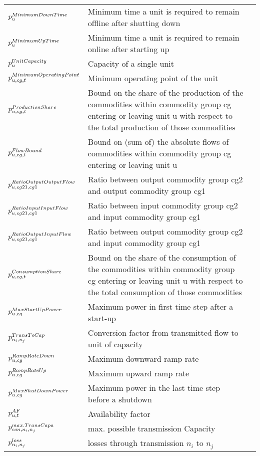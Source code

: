 \begin{longtable}{p{\cola} p{\colc} >{\small\raggedleft\arraybackslash\itshape}p{\colb}}
		$p^{MinimumDownTime}_{u}$	& Minimum time a unit is required to remain offline after shutting down	&                \\
		$p^{MinimumUpTime}_{u}$	& Minimum time a unit is required to remain online after starting up	&                \\
		$p^{UnitCapacity}_{u} $	& Capacity of a single unit                                   	&                \\
		$p^{MinimumOperatingPoint}_{u,cg,t}$	& Minimum operating point of the unit                         	&                \\
		$p^{ProductionShare}_{u,cg,t}$	& Bound on the share of the production of the commodities within commodity group cg entering or leaving unit u with respect to the total production of those commodities	&                \\
		$p^{FlowBound}_{u,cg,t}    $	& Bound on (sum of) the absolute flows of commodities within commodity group cg entering or leaving unit u 	&                \\
		$p^{RatioOutputOutputFlow}_{u,cg21,cg1}$	& Ratio between output commodity group cg2 and output commodity group cg1	&                \\
		$p^{RatioInputInputFlow}_{u,cg21,cg1}$	& Ratio between input commodity group cg2 and input commodity group cg1	&                \\
		$p^{RatioOutputInputFlow}_{u,cg21,cg1}$	& Ratio between output commodity group cg2 and input commodity group cg1	&                \\
		$p^{ConsumptionShare}_{u,cg,t}$	& Bound on the share of the consumption of the commodities within commodity group cg entering or leaving unit u with respect to the total consumption of those commodities	&                \\
		$p^{MaxStartUpPower}_{u,cg}$	& Maximum power in first time step after a start-up           	&                \\
		$p^{TransToCap}_{n_i,n_j}   $	& Conversion factor from transmitted flow to unit of capacity 	&                \\
		$p^{RampRateDown}_{u,cg} $	& Maximum downward ramp rate                                  	&                \\
		$p^{RampRateUp}_{u,cg}   $	& Maximum upward ramp rate                                    	&                \\
		$p^{MaxShutDownPower}_{u,cg}$	& Maximum power in the last time step before a shutdown       	&                \\
		$p^{AF}_{u,t}           $	& Availability factor                                         	&                \\[0.5em]

		$p^{max.TransCapa}_{{con},n_i,n_j} $	& max. possible transmission Capacity                         	&                \\
		$p^{loss}_{n_i,n_j}    $	& losses through transmission $n_i$ to $n_j$                  	&                \\
	\end{longtable}

